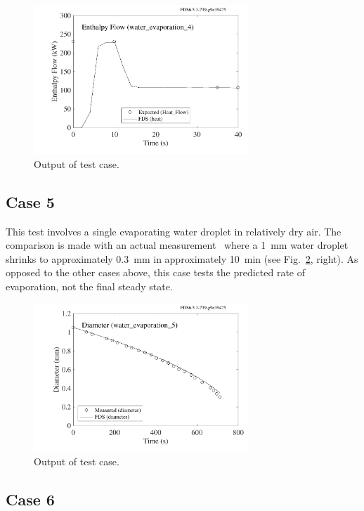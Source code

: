 \documentclass[11pt]{book}
\begin{document}
\begin{figure}[h!]
\centering
\includegraphics[height=2.2in]{SCRIPT_FIGURES/water_evaporation_4_enthalpy}
\caption[Sample case ]{Output of  test case.}
\label{water_evaporation_4_plot}
\end{figure}

\subsection{Case 5}
\label{water_evaporation_5}

This test involves a single evaporating water droplet in relatively dry air. The comparison is made with an actual measurement~\cite{Ranz} where a 1~mm water droplet
shrinks to approximately 0.3~mm in approximately 10~min (see Fig.~\ref{water_evaporation_5_plot}, right).
As opposed to the other cases above, this case tests the predicted rate of evaporation, not the final steady state.

\begin{figure}[h!]
\centering
\includegraphics[height=2.2in]{SCRIPT_FIGURES/water_evaporation_5_diameter}
\caption[Sample case ]{Output of  test case.}
\label{water_evaporation_5_plot}
\end{figure}

\subsection{Case 6}
\label{water_evaporation_6}
\end{document}
